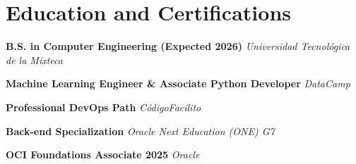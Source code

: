 \documentclass[a4paper,11pt]{article}
\begin{document}
\section*{Education and Certifications}

\textbf{B.S. in Computer Engineering (Expected 2026)} \hfill \textit{Universidad Tecnológica de la Mixteca} \par \vspace{4pt}

\textbf{Machine Learning Engineer \& Associate Python Developer} \hfill \textit{DataCamp} \par \vspace{4pt}

\textbf{Professional DevOps Path} \hfill \textit{CódigoFacilito} \par \vspace{4pt}

\textbf{Back-end Specialization} \hfill \textit{Oracle Next Education (ONE) G7} \par \vspace{4pt}

\textbf{OCI Foundations Associate 2025} \hfill \textit{Oracle} \par
\end{document}
